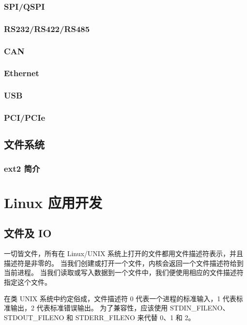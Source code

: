 \subsubsection{SPI/QSPI}

\subsubsection{RS232/RS422/RS485}

\subsubsection{CAN}

\subsubsection{Ethernet}

\subsubsection{USB}

\subsubsection{PCI/PCIe}

\subsection{文件系统}

\subsubsection{ext2 简介}

\section{Linux 应用开发}

\subsection{文件及 IO}

一切皆文件，所有在 Linux/UNIX 系统上打开的文件都用文件描述符表示，并且描述符是非零的。
当我们创建或打开一个文件，内核会返回一个文件描述符给到当前进程。
当我们读取或写入数据到一个文件中，我们便使用相应的文件描述符指定这个文件。

在类 UNIX 系统中约定俗成，文件描述符 0 代表一个进程的标准输入，1 代表标准输出，2 代表标准错误输出。
为了兼容性，应该使用 STDIN\_FILENO、STDOUT\_FILENO 和 STDERR\_FILENO 来代替 0、1 和 2。

